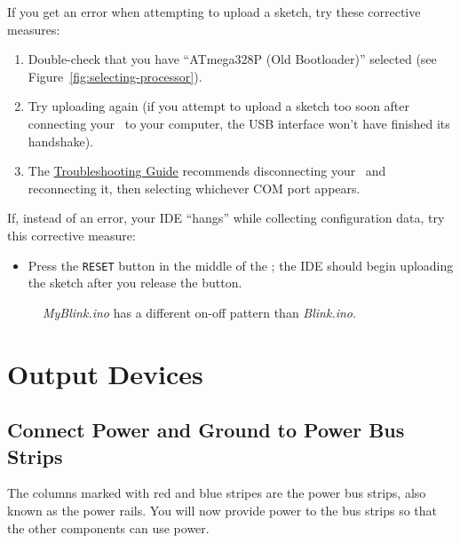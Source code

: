 If you get an error when attempting to upload a sketch, try these corrective
measures:

\begin{enumerate}
    \item Double-check that you have ``ATmega328P (Old Bootloader)'' selected
        (see Figure~\ref{fig:selecting-processor}).
    \item Try uploading again (if you attempt to upload a sketch too soon after
        connecting your \nano\ to your computer, the USB interface won't have
        finished its handshake).
    \item The \href{https://support.arduino.cc/hc/en-us/articles/4401874331410--Error-avrdude-when-uploading}{Troubleshooting
        Guide} recommends disconnecting your \nano\ and reconnecting it, then
        selecting whichever COM port appears.
\end{enumerate}

If, instead of an error, your IDE ``hangs'' while collecting configuration data, try this corrective measure:

\begin{itemize}
\item Press the \texttt{RESET} button in the middle of the \nano; the IDE
    should begin uploading the sketch after you release the button.
\end{itemize}

\begin{figure}
    \centering
    \caption{\textit{MyBlink.ino} has a different on-off
        pattern than \textit{Blink.ino}.\label{fig:myblink}}
\end{figure}


\section{Output Devices}

\subsection{Connect Power and Ground to Power Bus Strips}

The columns marked with red and blue stripes are the power bus strips, also
known as the power rails. You will now provide power to the bus strips so that
the other components can use power.

